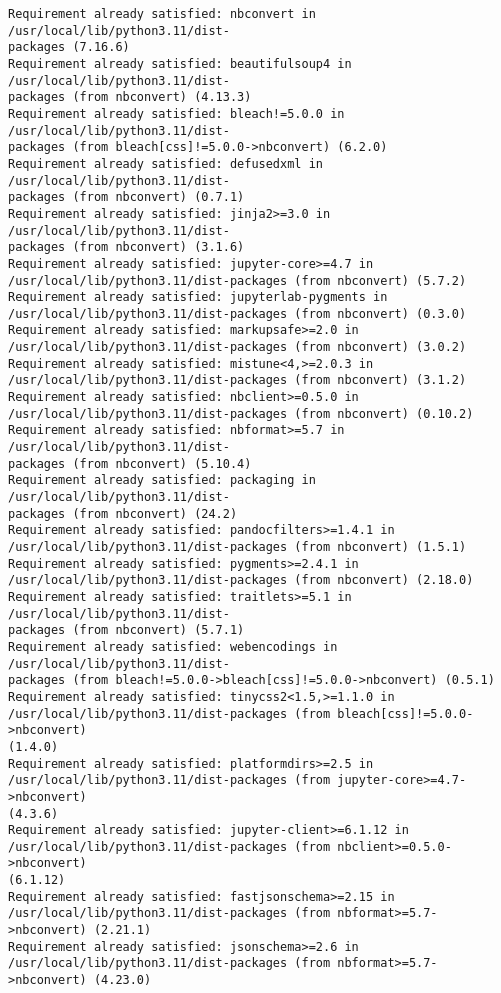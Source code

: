 \documentclass[11pt]{article}
\begin{document}
    \begin{Verbatim}[commandchars=\\\{\}]
Requirement already satisfied: nbconvert in /usr/local/lib/python3.11/dist-
packages (7.16.6)
Requirement already satisfied: beautifulsoup4 in /usr/local/lib/python3.11/dist-
packages (from nbconvert) (4.13.3)
Requirement already satisfied: bleach!=5.0.0 in /usr/local/lib/python3.11/dist-
packages (from bleach[css]!=5.0.0->nbconvert) (6.2.0)
Requirement already satisfied: defusedxml in /usr/local/lib/python3.11/dist-
packages (from nbconvert) (0.7.1)
Requirement already satisfied: jinja2>=3.0 in /usr/local/lib/python3.11/dist-
packages (from nbconvert) (3.1.6)
Requirement already satisfied: jupyter-core>=4.7 in
/usr/local/lib/python3.11/dist-packages (from nbconvert) (5.7.2)
Requirement already satisfied: jupyterlab-pygments in
/usr/local/lib/python3.11/dist-packages (from nbconvert) (0.3.0)
Requirement already satisfied: markupsafe>=2.0 in
/usr/local/lib/python3.11/dist-packages (from nbconvert) (3.0.2)
Requirement already satisfied: mistune<4,>=2.0.3 in
/usr/local/lib/python3.11/dist-packages (from nbconvert) (3.1.2)
Requirement already satisfied: nbclient>=0.5.0 in
/usr/local/lib/python3.11/dist-packages (from nbconvert) (0.10.2)
Requirement already satisfied: nbformat>=5.7 in /usr/local/lib/python3.11/dist-
packages (from nbconvert) (5.10.4)
Requirement already satisfied: packaging in /usr/local/lib/python3.11/dist-
packages (from nbconvert) (24.2)
Requirement already satisfied: pandocfilters>=1.4.1 in
/usr/local/lib/python3.11/dist-packages (from nbconvert) (1.5.1)
Requirement already satisfied: pygments>=2.4.1 in
/usr/local/lib/python3.11/dist-packages (from nbconvert) (2.18.0)
Requirement already satisfied: traitlets>=5.1 in /usr/local/lib/python3.11/dist-
packages (from nbconvert) (5.7.1)
Requirement already satisfied: webencodings in /usr/local/lib/python3.11/dist-
packages (from bleach!=5.0.0->bleach[css]!=5.0.0->nbconvert) (0.5.1)
Requirement already satisfied: tinycss2<1.5,>=1.1.0 in
/usr/local/lib/python3.11/dist-packages (from bleach[css]!=5.0.0->nbconvert)
(1.4.0)
Requirement already satisfied: platformdirs>=2.5 in
/usr/local/lib/python3.11/dist-packages (from jupyter-core>=4.7->nbconvert)
(4.3.6)
Requirement already satisfied: jupyter-client>=6.1.12 in
/usr/local/lib/python3.11/dist-packages (from nbclient>=0.5.0->nbconvert)
(6.1.12)
Requirement already satisfied: fastjsonschema>=2.15 in
/usr/local/lib/python3.11/dist-packages (from nbformat>=5.7->nbconvert) (2.21.1)
Requirement already satisfied: jsonschema>=2.6 in
/usr/local/lib/python3.11/dist-packages (from nbformat>=5.7->nbconvert) (4.23.0)

\end{Verbatim}
\end{document}
